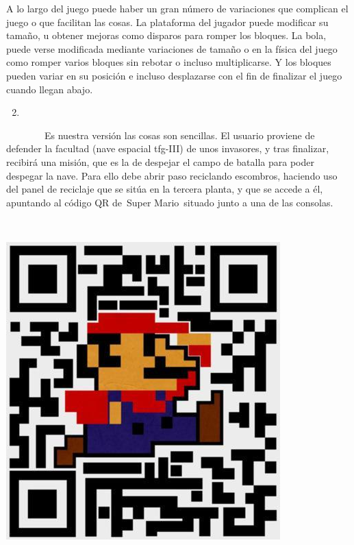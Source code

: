 \documentclass[]{article}
\begin{document}
A lo largo del juego puede haber un gran número de variaciones que
complican el juego o que facilitan las cosas. La plataforma del jugador
puede modificar su tamaño, u obtener mejoras como disparos para romper
los bloques. La bola, puede verse modificada mediante variaciones de
tamaño o en la física del juego como romper varios bloques sin rebotar o
incluso multiplicarse. Y los bloques pueden variar en su posición e
incluso desplazarse con el fin de finalizar el juego cuando llegan
abajo.

\begin{enumerate}
\setcounter{enumi}{1}
\item
\end{enumerate}

~~~~~~~~Es nuestra versión las cosas son sencillas. El usuario proviene
de defender la facultad (nave espacial tfg-III) de unos invasores, y
tras finalizar, recibirá una misión, que es la de despejar el campo de
batalla para poder despegar la nave. Para ello debe abrir paso
reciclando escombros, haciendo uso del panel de reciclaje que se sitúa
en la tercera planta, y que se accede a él, apuntando al código QR
de~Super Mario~situado junto a una de las consolas.

~~~~~~~~~~~~~~~~~ ~~~~~~~~~~~~~~~~~

\includegraphics{images/image14.jpg}
\end{document}
